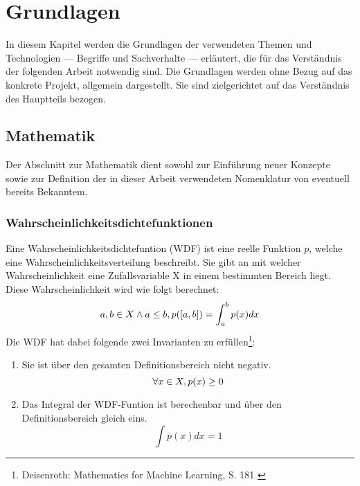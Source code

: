 \chapter{Grundlagen}
\label{ch:Grundlagen}

In diesem Kapitel werden die Grundlagen der verwendeten Themen und Technologien --- Begriffe und Sachverhalte --- erläutert, die für das Verständnis der folgenden Arbeit notwendig sind.
Die Grundlagen werden ohne Bezug auf das konkrete Projekt, allgemein dargestellt. Sie sind zielgerichtet auf das Verständnis des Hauptteils bezogen.





\section{Mathematik}

Der Abschnitt zur Mathematik dient sowohl zur Einführung neuer Konzepte sowie zur Definition der in dieser Arbeit verwendeten Nomenklatur von eventuell bereits Bekanntem.

\subsection{Wahrscheinlichkeitsdichtefunktionen}
Eine Wahrscheinlichkeitsdichtefuntion (WDF) ist eine reelle Funktion $p$, welche eine Wahrscheinlichkeitsverteilung beschreibt. Sie gibt an mit welcher Wahrscheinlichkeit eine Zufallsvariable X in einem bestimmten Bereich liegt. Diese Wahrscheinlichkeit wird wie folgt berechnet:
\begin{equation}
    a,b \in X \land a \le b, \space p([a, b]) = \int_a^b p(x) dx
\end{equation}
Die WDF hat dabei folgende zwei Invarianten zu erfüllen\footnote{
    Deisenroth: Mathematics for Machine Learning, S. 181
    \cite{Deisenroth2020}
}:
\begin{enumerate}
    \item Sie ist über den gesamten Definitionsbereich nicht negativ. 
    \begin{equation}
        \forall x \in X, \space p(x) \ge 0
    \end{equation}
    \item Das Integral der WDF-Funtion ist berechenbar und über den Definitionsbereich gleich eins.
    \begin{equation}
        \int p(x) dx = 1
    \end{equation}
\end{enumerate}

